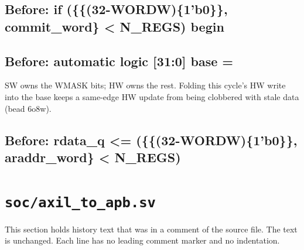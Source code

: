 \begin{record}

\subsection*{Before: if (\{\{(32-WORDW)\{1'b0\}\}, commit\_word\} < N\_REGS) begin}


\subsection*{Before: automatic logic [31:0]     base =}

\begin{textblock}
SW owns the WMASK bits; HW owns the rest.  Folding this
cycle's HW write into the base keeps a same-edge HW update
from being clobbered with stale data (bead 6o8w).
\end{textblock}

\subsection*{Before: rdata\_q  <= (\{\{(32-WORDW)\{1'b0\}\}, araddr\_word\} < N\_REGS)}


\end{record}

\section{\texttt{soc/axil\_to\_apb.sv}}\label{cr:mod:axil-to-apb}

This section holds history text that was in a comment of the source file. The text is unchanged. Each line has no leading comment marker and no indentation.


